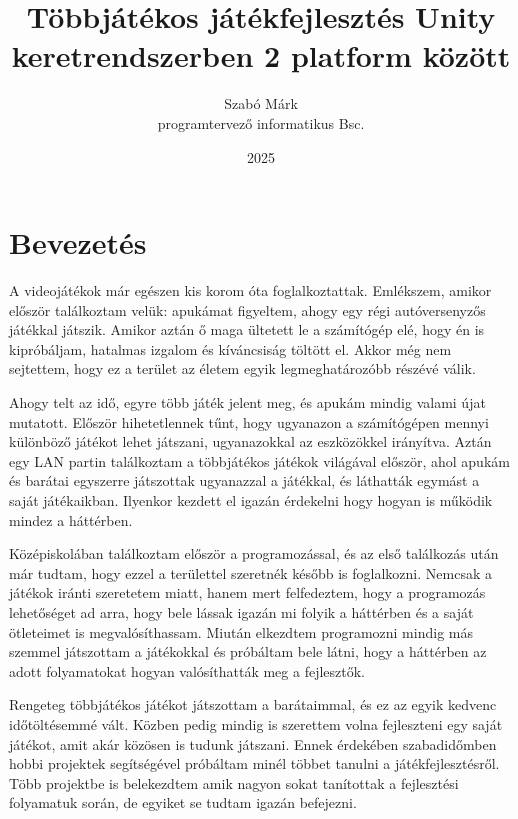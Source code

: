 \documentclass[]{thesis-ekf}
\theoremstyle{definition}
\theoremstyle{remark}
\begin{document}
\title{Többjátékos játékfejlesztés Unity keretrendszerben 2 platform között}
\author{Szabó Márk\\programtervező informatikus Bsc.}
\date{2025}
\maketitle

\tableofcontents

\chapter*{Bevezetés}

A videojátékok már egészen kis korom óta foglalkoztattak. Emlékszem, amikor először találkoztam velük: apukámat figyeltem, ahogy egy régi autóversenyzős játékkal játszik. Amikor aztán ő maga ültetett le a számítógép elé, hogy én is kipróbáljam, hatalmas izgalom és kíváncsiság töltött el. Akkor még nem sejtettem, hogy ez a terület az életem egyik legmeghatározóbb részévé válik.

Ahogy telt az idő, egyre több játék jelent meg, és apukám mindig valami újat mutatott. Először hihetetlennek tűnt, hogy ugyanazon a számítógépen mennyi különböző játékot lehet játszani, ugyanazokkal az eszközökkel irányítva. Aztán egy LAN partin találkoztam a többjátékos játékok világával először, ahol apukám és barátai egyszerre játszottak ugyanazzal a játékkal, és láthatták egymást a saját játékaikban. Ilyenkor kezdett el igazán érdekelni hogy hogyan is működik mindez a háttérben. 

Középiskolában találkoztam először a programozással, és az első találkozás után már tudtam, hogy ezzel a területtel szeretnék később is foglalkozni. Nemcsak a játékok iránti szeretetem miatt, hanem mert felfedeztem, hogy a programozás lehetőséget ad arra, hogy bele lássak igazán mi folyik a háttérben és a saját ötleteimet is megvalósíthassam. Miután elkezdtem programozni mindig más szemmel játszottam a játékokkal és próbáltam bele látni, hogy a háttérben az adott folyamatokat hogyan valósíthatták meg a fejlesztők.

Rengeteg többjátékos játékot játszottam a barátaimmal, és ez az egyik kedvenc időtöltésemmé vált. Közben pedig mindig is szerettem volna fejleszteni egy saját játékot, amit akár közösen is tudunk játszani. Ennek érdekében szabadidőmben hobbi projektek segítségével próbáltam minél többet tanulni a játékfejlesztésről. Több projektbe is belekezdtem amik nagyon sokat tanítottak a fejlesztési folyamatuk során, de egyiket se tudtam igazán befejezni.
\end{document}
